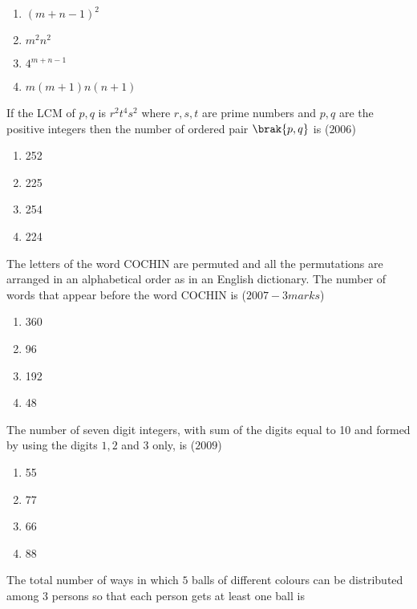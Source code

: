 \begin{multicols}{2} 
\begin{enumerate}
\item  $(m+n-1)^2$
\item  $m^2n^2$\columnbreak\item  $4^{m+n-1}$\item $m(m+1)n(n+1)$
\end{enumerate}
\end{multicols}
\item If the LCM of $p,q$ is $r^2t^4s^2$ where $r,s,t$ are prime numbers and $p,q$ are the positive integers then the number of ordered pair $\brak{p,q}$ is \hfill{($2006$)}\\
\begin{multicols}{2} 
\begin{enumerate}
\item  252\item  225\columnbreak\item  254\item  224
\end{enumerate}
\end{multicols}
\item The letters of the word COCHIN are permuted and all the permutations are arranged in an alphabetical order as in an English dictionary. The number of words that appear before the word COCHIN is
\hfill{($2007-3 marks$)}\\
\begin{multicols}{2} 
\begin{enumerate}
\item  360\item  96\columnbreak\item 192\item  48
\end{enumerate}
\end{multicols}
\item The number of seven digit integers, with sum of the digits equal to 10 and formed by using the digits $1,2$ and $3$ only, is
\hfill{($2009$)}\\
\begin{multicols}{2} 
\begin{enumerate}
\item 55\item 77\columnbreak\item  66\item 88
\end{enumerate}
\end{multicols}
\item The total number of ways in which $5$ balls of different colours can be distributed among $3$ persons so that each person gets at least one ball is
